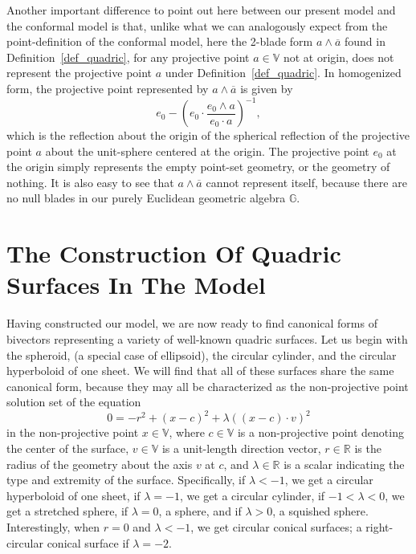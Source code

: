 \documentclass{ecgd-l}
\newcommand{\G}{\mathbb{G}}
\newcommand{\V}{\mathbb{V}}
\newcommand{\R}{\mathbb{R}}
\theoremstyle{definition}
\theoremstyle{remark}
\numberwithin{equation}{section}
\begin{document}
Another important difference to point out here between our present model and the conformal model is that,
unlike what we can analogously expect from the point-definition of the conformal model,
here the 2-blade form $a\wedge\overline{a}$ found in Definition~\ref{def_quadric}, for
any projective point $a\in\V$ not at origin, does not represent the projective point $a$ under Definition~\ref{def_quadric}.
In homogenized form, the projective point represented by $a\wedge\overline{a}$ is given by
\begin{equation}
e_0 - \left(e_0\cdot\frac{e_0\wedge a}{e_0\cdot a}\right)^{-1},
\end{equation}
which is the reflection about the origin of the spherical reflection of the projective point $a$
about the unit-sphere centered at the origin.  The projective point $e_0$ at the origin
simply represents the empty point-set geometry, or the geometry of nothing.  It is also
easy to see that $a\wedge\overline{a}$ cannot represent itself, because there are no
null blades in our purely Euclidean geometric algebra $\G$.

\section{The Construction Of Quadric Surfaces In The Model}

Having constructed our model, we are now ready to find canonical forms of bivectors
representing a variety of well-known quadric surfaces.  Let us begin with the
spheroid, (a special case of ellipsoid), the circular cylinder, and the circular hyperboloid
of one sheet.  We will find that all of these surfaces share the same canonical form,
because they may all be characterized as the non-projective point solution set of the equation
\begin{equation}\label{equ_spheroid}
0 = -r^2 + (x-c)^2 + \lambda((x-c)\cdot v)^2
\end{equation}
in the non-projective point $x\in\V$, where $c\in\V$ is a non-projective
point denoting the center of the surface, $v\in\V$ is a unit-length direction
vector, $r\in\R$ is the radius of the geometry about the axis $v$ at $c$, and
$\lambda\in\R$ is a scalar indicating the type and extremity of the surface.
Specifically, if $\lambda<-1$, we get a circular hyperboloid of one sheet,
if $\lambda=-1$, we get a circular cylinder, if $-1<\lambda<0$, we get a stretched
sphere, if $\lambda=0$, a sphere, and if $\lambda>0$, a squished sphere.  Interestingly,
when $r=0$ and $\lambda<-1$, we get circular conical surfaces; a right-circular conical
surface if $\lambda=-2$.
\end{document}
